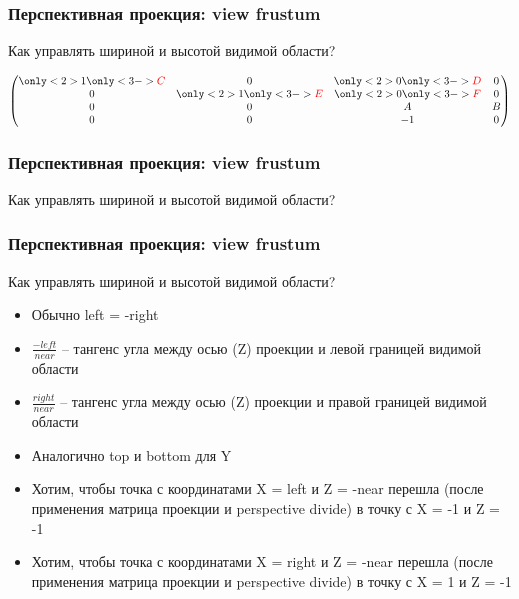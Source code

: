 \documentclass{beamer}
\begin{document}
\begin{frame}[fragile]
\frametitle{Перспективная проекция: view frustum}
Как управлять шириной и высотой видимой области?
\pause
\begin{center}
\begin{math}
\begin{pmatrix}
\only<2>{1}\only<3->{\color{red}C} & 0 & \only<2>{0}\only<3->{\color{red}D} & 0 \\
0 & \only<2>{1}\only<3->{\color{red}E} & \only<2>{0}\only<3->{\color{red}F} & 0 \\
0 & 0 & A & B \\
0 & 0 & -1 & 0
\end{pmatrix}
\end{math}
\end{center}
\end{frame}

\begin{frame}[fragile]
\frametitle{Перспективная проекция: view frustum}
Как управлять шириной и высотой видимой области?
\end{frame}

\begin{frame}[fragile]
\frametitle{Перспективная проекция: view frustum}
Как управлять шириной и высотой видимой области?
\begin{itemize}
\item Обычно left = -right
\pause
\item \begin{math}\frac{-left}{near}\end{math} -- тангенс угла между осью (Z) проекции и левой границей видимой области
\item \begin{math}\frac{right}{near}\end{math} -- тангенс угла между осью (Z) проекции и правой границей видимой области
\pause
\item Аналогично top и bottom для Y
\pause
\item Хотим, чтобы точка с координатами X = left и Z = -near перешла (после применения матрица проекции и perspective divide) в точку с X = -1 и Z = -1
\item Хотим, чтобы точка с координатами X = right и Z = -near перешла (после применения матрица проекции и perspective divide) в точку с X = 1 и Z = -1
\end{itemize}
\end{frame}
\end{document}
